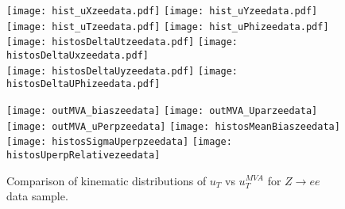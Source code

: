     
\begin{figure}[h]
	\centering
	{\texttt{[image: hist\_uXzeedata.pdf]}}
	{\texttt{[image: hist\_uYzeedata.pdf]}} \\
	{\texttt{[image: hist\_uTzeedata.pdf]}}
	{\texttt{[image: hist\_uPhizeedata.pdf]}}\\
	{\texttt{[image: histosDeltaUtzeedata.pdf]}}
	{\texttt{[image: histosDeltaUxzeedata.pdf]}} \\
	{\texttt{[image: histosDeltaUyzeedata.pdf]}}
	{\texttt{[image: histosDeltaUPhizeedata.pdf]}}\\
	\label{fig:zee_data_distributions1}
\end{figure}
\begin{figure}[h]
	\centering
	{\texttt{[image: outMVA\_biaszeedata]}}
	{\texttt{[image: outMVA\_Uparzeedata]}}
	{\texttt{[image: outMVA\_uPerpzeedata]}}
	{\texttt{[image: histosMeanBiaszeedata]}}
	{\texttt{[image: histosSigmaUperpzeedata]}}
	{\texttt{[image: histosUperpRelativezeedata]}}
	\caption{Comparison of kinematic distributions of $u_T$ vs $u_T^{MVA}$ for $Z\rightarrow ee$ data sample.}
	\label{fig:zee_data_distributions2}
\end{figure}
%
%
